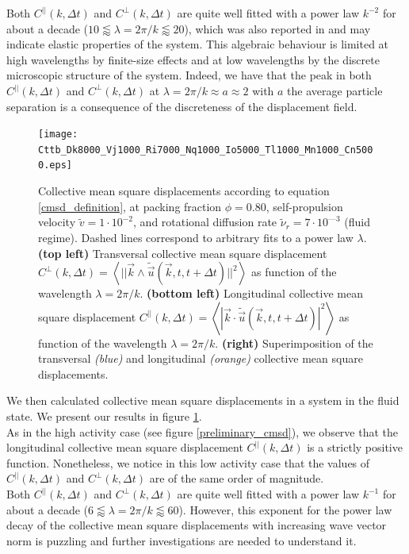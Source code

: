 \documentclass[class=report, float=false, crop=false]{standalone}
\begin{document}
Both $C^{||}(k, \Delta t)$ and $C^{\perp}(k, \Delta t)$ are quite well fitted with a power law $k^{-2}$ for about a decade ($10 \lessapprox \lambda = 2\pi/k \lessapprox 20$), which was also reported in \cite{leonforte2005continuum} and may indicate elastic properties of the system. This algebraic behaviour is limited at high wavelengths by finite-size effects and at low wavelengths by the discrete microscopic structure of the system. Indeed, we have that the peak in both $C^{||}(k, \Delta t)$ and $C^{\perp}(k, \Delta t)$ at $\lambda = 2\pi/k \approx a \approx 2$ with $a$ the average particle separation is a consequence of the discreteness of the displacement field.

\begin{figure}[H]
\centering
\texttt{[image: Cttb\_Dk8000\_Vj1000\_Ri7000\_Nq1000\_Io5000\_Tl1000\_Mn1000\_Cn5000.eps]}
\caption{Collective mean square displacements according to equation \ref{cmsd_definition}, at packing fraction $\phi = 0.80$, self-propulsion velocity $\tilde{v} = 1\cdot10^{-2}$, and rotational diffusion rate $\tilde{\nu}_r = 7\cdot10^{—3}$ (fluid regime). Dashed lines correspond to arbitrary fits to a power law $\lambda$. \textbf{(top left)} Transversal collective mean square displacement $C^{\perp}(k, \Delta t) = \left<||\vec{k}\wedge\tilde{\vec{u}}(\vec{k}, t, t + \Delta t)||^2\right>$ as function of the wavelength $\lambda = 2\pi/k$. \textbf{(bottom left)} Longitudinal collective mean square displacement $C^{||}(k, \Delta t) = \left<|\vec{k}\cdot\tilde{\vec{u}}(\vec{k}, t, t + \Delta t)|^2\right>$ as function of the wavelength $\lambda = 2\pi/k$. \textbf{(right)} Superimposition of the transversal \textit{(blue)} and longitudinal \textit{(orange)} collective mean square displacements.}
\label{preliminary_cmsd_low_activity}
\end{figure}

We then calculated collective mean square displacements in a system in the fluid state. We present our results in figure \ref{preliminary_cmsd_low_activity}.\\

As in the high activity case (see figure \ref{preliminary_cmsd}), we observe that the longitudinal collective mean square displacement $C^{||}(k, \Delta t)$ is a strictly positive function. Nonetheless, we notice in this low activity case that the values of $C^{||}(k, \Delta t)$ and $C^{\perp}(k, \Delta t)$ are of the same order of magnitude.\\

Both $C^{||}(k, \Delta t)$ and $C^{\perp}(k, \Delta t)$ are quite well fitted with a power law $k^{-1}$ for about a decade ($6 \lessapprox \lambda = 2\pi/k \lessapprox 60$). However, this exponent for the power law decay of the collective mean square displacements with increasing wave vector norm is puzzling and further investigations are needed to understand it.
\end{document}
